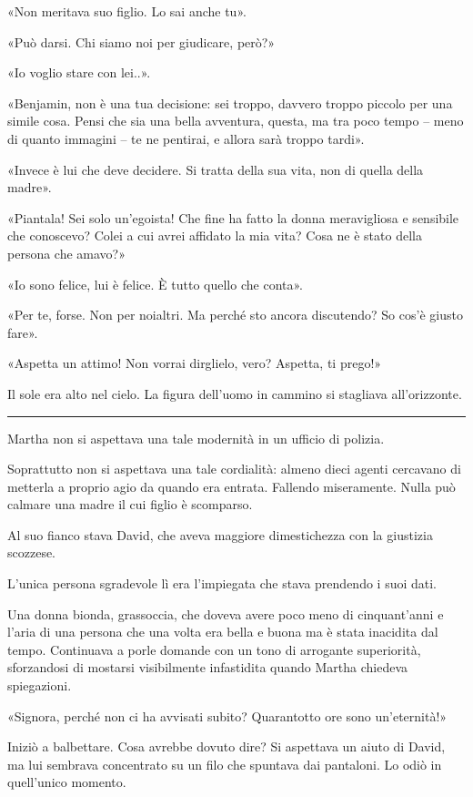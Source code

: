 \documentclass[a4paper,10pt]{memoir}
\begin{document}
«Non meritava suo figlio. Lo sai anche tu».

«Può darsi. Chi siamo noi per giudicare, però?»

«Io voglio stare con lei..».

«Benjamin, non è una tua decisione: sei troppo, davvero troppo piccolo per una simile cosa. Pensi che sia una bella
avventura, questa, ma tra poco tempo -- meno di quanto immagini -- te ne pentirai, e allora sarà troppo tardi».

«Invece è lui che deve decidere. Si tratta della sua vita, non di quella della madre».

«Piantala! Sei solo un'egoista! Che fine ha fatto la donna meravigliosa e sensibile che conoscevo? Colei a cui avrei
affidato la mia vita? Cosa ne è stato della persona che amavo?»

«Io sono felice, lui è felice. È tutto quello che conta».

«Per te, forse. Non per noialtri. Ma perché sto ancora discutendo? So cos'è giusto fare».

«Aspetta un attimo! Non vorrai dirglielo, vero? Aspetta, ti prego!»

Il sole era alto nel cielo. La figura dell'uomo in cammino si stagliava all'orizzonte.

\plainbreak{1}

Martha non si aspettava una tale modernità in un ufficio di polizia.

Soprattutto non si aspettava una tale cordialità: almeno dieci agenti cercavano di metterla a proprio agio da quando era
entrata. Fallendo miseramente. Nulla può calmare una madre il cui figlio è scomparso.

Al suo fianco stava David, che aveva maggiore dimestichezza con la giustizia scozzese.

L'unica persona sgradevole lì era l'impiegata che stava prendendo i suoi dati.

Una donna bionda, grassoccia, che doveva avere poco meno di cinquant'anni e l'aria di una persona che una volta era
bella e buona ma è stata inacidita dal tempo. Continuava a porle domande con un tono di arrogante superiorità,
sforzandosi di mostarsi visibilmente infastidita quando Martha chiedeva spiegazioni.

«Signora, perché non ci ha avvisati subito? Quarantotto ore sono un'eternità!»

Iniziò a balbettare. Cosa avrebbe dovuto dire? Si aspettava un aiuto di David, ma lui sembrava concentrato su un filo
che spuntava dai pantaloni. Lo odiò in quell'unico momento.
\end{document}
